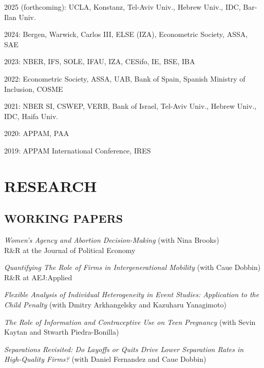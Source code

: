 \documentclass[margin]{res} %
\newcommand{\rootFolder}{/Users/tomzohar/Dropbox/}
\begin{document}
\begin{resume}
 2025 (forthcoming): UCLA, Konstanz, Tel-Aviv Univ., Hebrew Univ., IDC, Bar-Ilan Univ.

 2024: Bergen, Warwick, Carlos III, ELSE (IZA), Econometric Society, ASSA, SAE

 2023: NBER, IFS, SOLE, IFAU, IZA, CESifo, IE, BSE, IBA

 2022: Econometric Society, ASSA, UAB, Bank of Spain, Spanish Ministry of Inclusion, COSME

 2021: NBER SI, CSWEP, VERB, Bank of Israel, Tel-Aviv Univ., Hebrew Univ., IDC, Haifa Univ.

 2020: APPAM, PAA

 2019: APPAM International Conference, IRES


\section{RESEARCH} 

\subsection{WORKING PAPERS}

\textit{Women's Agency and Abortion Decision-Making} (with Nina Brooks) \\
R\&R at the Journal of Political Economy

\textit{Quantifying The Role of Firms in Intergenerational Mobility} (with Caue Dobbin) \\
R\&R at AEJ:Applied

%

\textit{Flexible Analysis of Individual Heterogeneity in Event Studies: Application to the Child Penalty} (with Dmitry Arkhangelsky and Kazuharu Yanagimoto)

\textit{The Role of Information and Contraceptive Use on Teen Pregnancy} (with Sevin Kaytan and Stwarth Piedra-Bonilla)

\textit{Separations Revisited: Do Layoffs or Quits Drive Lower Separation Rates in High-Quality Firms?} (with Daniel Fernandez and Caue Dobbin) 




\end{resume}
\end{document}
